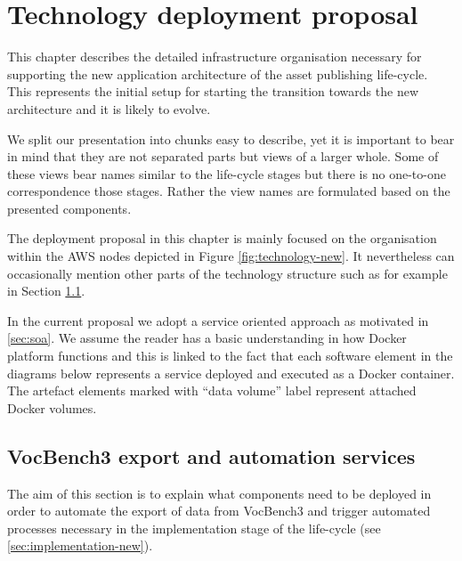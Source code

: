 \chapter{Technology deployment proposal}


	This chapter describes the detailed infrastructure organisation necessary for supporting the new application architecture of the asset publishing life-cycle. This represents the initial setup for starting the transition towards the new architecture and it is likely to evolve. 
	
	We split our presentation into chunks easy to describe, yet it is important to bear in mind that they are not separated parts but views of a larger whole. Some of these views bear names similar to the life-cycle stages but there is no one-to-one correspondence those stages. Rather the view names are formulated based on the presented components.
	
	The deployment proposal in this chapter is mainly focused on the organisation within the AWS nodes depicted in Figure \ref{fig:technology-new}. It nevertheless can occasionally mention other parts of the technology structure such as for example in Section \ref{sec:technology-view-vb3-export}. 
	
	In the current proposal we adopt a service oriented approach as motivated in \ref{sec:soa}. We assume the reader has a basic understanding in how Docker platform \citep{docker} functions and this is linked to the fact that each software element in the diagrams below represents a service deployed and executed as a Docker container. The artefact elements marked with ``data volume'' label represent attached Docker volumes.  
	

	\section{VocBench3 export and automation services}
	\label{sec:technology-view-vb3-export}
	
	The aim of this section is to explain what components need to be deployed in order to automate the export of data from VocBench3 and trigger automated processes necessary in the implementation stage of the life-cycle (see \ref{sec:implementation-new}).	
	
	
	
